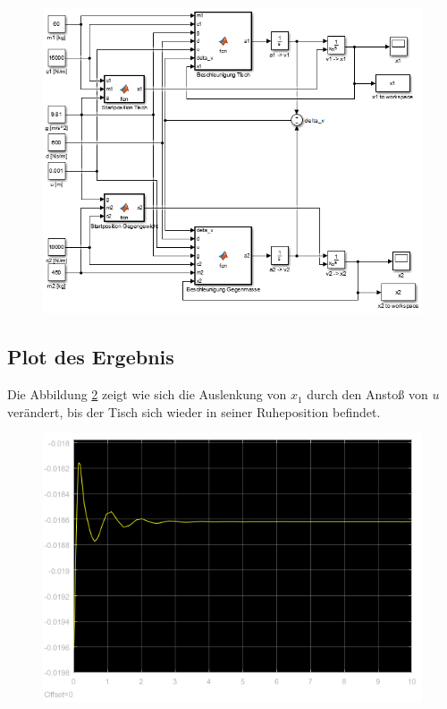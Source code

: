\documentclass[]{scrartcl}
\begin{document}
\begin{figure}[H]
\centering
\includegraphics[width=1\linewidth]{./4_Modell}
\caption{}
\label{fig:4_Modell}
\end{figure}

\subsection{Plot des Ergebnis}
Die Abbildung \ref{fig:4_Plot} zeigt wie sich die Auslenkung von $x_{1}$ durch den Anstoß von $u$ verändert, bis der Tisch sich wieder in seiner Ruheposition befindet.

\begin{figure}[H]
\centering
\includegraphics[width=0.5\linewidth]{./4_Plot}
\caption{}
\label{fig:4_Plot}
\end{figure}
\end{document}
